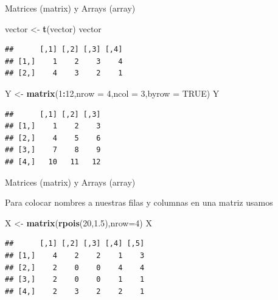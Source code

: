 \documentclass[ignorenonframetext,]{beamer}
\newenvironment{Shaded}{\begin{snugshade}}{\end{snugshade}}
\newcommand{\KeywordTok}[1]{\textcolor[rgb]{0.13,0.29,0.53}{\textbf{#1}}}
\newcommand{\DataTypeTok}[1]{\textcolor[rgb]{0.13,0.29,0.53}{#1}}
\newcommand{\DecValTok}[1]{\textcolor[rgb]{0.00,0.00,0.81}{#1}}
\newcommand{\FloatTok}[1]{\textcolor[rgb]{0.00,0.00,0.81}{#1}}
\newcommand{\StringTok}[1]{\textcolor[rgb]{0.31,0.60,0.02}{#1}}
\newcommand{\OtherTok}[1]{\textcolor[rgb]{0.56,0.35,0.01}{#1}}
\newcommand{\OperatorTok}[1]{\textcolor[rgb]{0.81,0.36,0.00}{\textbf{#1}}}
\newcommand{\NormalTok}[1]{#1}
\begin{document}
\begin{frame}[fragile]{Matrices (matrix) y Arrays (array)}

\begin{Shaded}
\begin{Highlighting}[]
\NormalTok{vector <-}\StringTok{ }\KeywordTok{t}\NormalTok{(vector)}
\NormalTok{vector}
\end{Highlighting}
\end{Shaded}

\begin{verbatim}
##      [,1] [,2] [,3] [,4]
## [1,]    1    2    3    4
## [2,]    4    3    2    1
\end{verbatim}

\begin{Shaded}
\begin{Highlighting}[]
\NormalTok{Y <-}\StringTok{ }\KeywordTok{matrix}\NormalTok{(}\DecValTok{1}\OperatorTok{:}\DecValTok{12}\NormalTok{,}\DataTypeTok{nrow =} \DecValTok{4}\NormalTok{,}\DataTypeTok{ncol =} \DecValTok{3}\NormalTok{,}\DataTypeTok{byrow =} \OtherTok{TRUE}\NormalTok{)}
\NormalTok{Y}
\end{Highlighting}
\end{Shaded}

\begin{verbatim}
##      [,1] [,2] [,3]
## [1,]    1    2    3
## [2,]    4    5    6
## [3,]    7    8    9
## [4,]   10   11   12
\end{verbatim}

\end{frame}

\begin{frame}[fragile]{Matrices (matrix) y Arrays (array)}

Para colocar nombres a nuestras filas y columnas en una matriz usamos

\begin{Shaded}
\begin{Highlighting}[]
\NormalTok{X <-}\StringTok{ }\KeywordTok{matrix}\NormalTok{(}\KeywordTok{rpois}\NormalTok{(}\DecValTok{20}\NormalTok{,}\FloatTok{1.5}\NormalTok{),}\DataTypeTok{nrow=}\DecValTok{4}\NormalTok{)}
\NormalTok{X}
\end{Highlighting}
\end{Shaded}

\begin{verbatim}
##      [,1] [,2] [,3] [,4] [,5]
## [1,]    4    2    2    1    3
## [2,]    2    0    0    4    4
## [3,]    2    0    0    1    1
## [4,]    2    3    2    2    1
\end{verbatim}

\end{frame}
\end{document}
